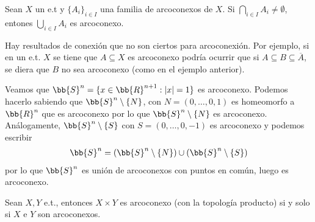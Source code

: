\begin{teo}
    Sean $X$ un e.t y $\{A_i\}_{i\in I}$ una familia de arcoconexos de $X$. Si $\bigcap\limits_{i\in I}A_i \neq \emptyset$, entones $\bigcup\limits_{i\in I}A_i$ es arcoconexo.
\end{teo}

\begin{observacion}
    Hay resultados de conexión que no son ciertos para arcoconexión. Por ejemplo, si en un e.t. $X$ se tiene que $A\subseteq X$ es arcoconexo podría ocurrir que si $A\subseteq B \subseteq \overline{A}$, se diera que $B$ no sea arcoconexo (como en el ejemplo anterior).
\end{observacion}

\begin{ejemplo}
    Veamos que $\bb{S}^n = \{x\in \bb{R}^{n+1} : |x| = 1\}$ es arcoconexo. Podemos hacerlo sabiendo que $\bb{S}^n\setminus \{N\}$, con $N=(0,\dots,0,1)$ es homeomorfo a $\bb{R}^n$ que es arcoconexo por lo que $\bb{S}^n \setminus\{N\}$ es arcoconexo. Análogamente, $\bb{S}^n \setminus\{S\}$ con $S=(0,\dots,0,-1)$ es arcoconexo y podemos escribir
    \begin{gather*}
        \bb{S}^n = (\bb{S}^n \setminus\{N\}) \cup (\bb{S}^n \setminus\{S\})
    \end{gather*}
    por lo que $\bb{S}^n$ es unión de arcoconexos con puntos en común, luego es arcoconexo.
\end{ejemplo}

\begin{teo}
    Sean $X,Y$ e.t., entonces $X\times Y$ es arcoconexo (con la topología producto) si y solo si $X$ e $Y$ son arcoconexos.
\end{teo}

